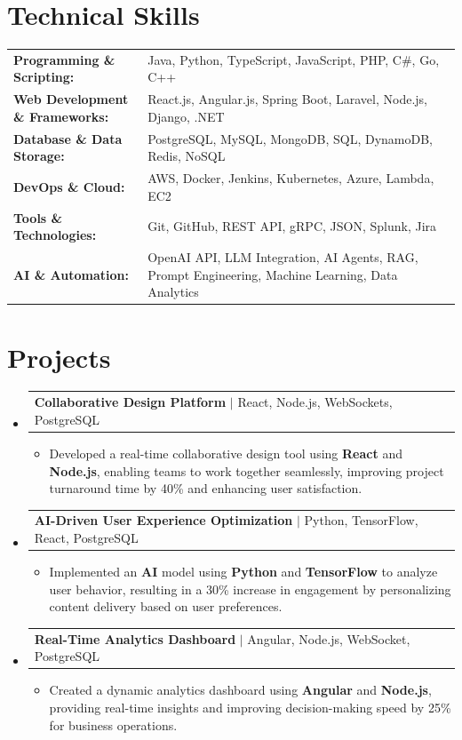 \documentclass[letterpaper,10pt]{article}
\makeatletter
\newcommand{\resumeItem}[1]{
  \item{\fontsize{8pt}{9pt}\selectfont
    #1 \vspace{-3pt}
  }
}
\newcommand{\resumeProjectHeading}[2]{
    \item
    \begin{tabular*}{1.001\textwidth}{l@{\extracolsep{\fill}}r}
      \fontsize{8.5pt}{10pt}#1 & \textbf{\fontsize{8.5pt}{10pt} #2}\\
    \end{tabular*}\vspace{-7pt}
}
\newcommand{\resumeSubHeadingListStart}{\begin{itemize}[leftmargin=0pt, label={}]}
\newcommand{\resumeSubHeadingListEnd}{\end{itemize}}
\newcommand{\resumeItemListStart}{\begin{itemize}[leftmargin=*]}
\newcommand{\resumeItemListEnd}{\end{itemize}\vspace{-5pt}}
\makeatother
\begin{document}
\section{Technical Skills}
        \vspace{-14pt}
        \begin{table}[h]
            \fontsize{8pt}{9pt}\selectfont
            \begin{tabular}{p{0.3\linewidth} p{0.7\linewidth}}
                \textbf{Programming \& Scripting:} & Java, Python, TypeScript, JavaScript, PHP, C\#, Go, C++ \\
                \textbf{Web Development \& Frameworks:} & React.js, Angular.js, Spring Boot, Laravel, Node.js, Django, .NET \\
                \textbf{Database \& Data Storage:} & PostgreSQL, MySQL, MongoDB, SQL, DynamoDB, Redis, NoSQL \\
                \textbf{DevOps \& Cloud:} & AWS, Docker, Jenkins, Kubernetes, Azure, Lambda, EC2 \\
                \textbf{Tools \& Technologies:} & Git, GitHub, REST API, gRPC, JSON, Splunk, Jira \\
                \textbf{AI \& Automation:} & OpenAI API, LLM Integration, AI Agents, RAG, Prompt Engineering, Machine Learning, Data Analytics \\
            \end{tabular}
        \end{table}
 \vspace{-18pt}

\section{Projects}
    \vspace{-5pt}
    \resumeSubHeadingListStart
          \resumeProjectHeading
            {\textbf{Collaborative Design Platform} $|$ React, Node.js, WebSockets, PostgreSQL}{}
            \resumeItemListStart
                \resumeItem{Developed a real-time collaborative design tool using \textbf{React} and \textbf{Node.js}, enabling teams to work together seamlessly, improving project turnaround time by 40\% and enhancing user satisfaction.}
            \resumeItemListEnd
        \vspace{-12pt}
    
        \resumeProjectHeading
            {\textbf{AI-Driven User Experience Optimization} $|$ Python, TensorFlow, React, PostgreSQL}{}
        \resumeItemListStart
                \resumeItem{Implemented an \textbf{AI} model using \textbf{Python} and \textbf{TensorFlow} to analyze user behavior, resulting in a 30\% increase in engagement by personalizing content delivery based on user preferences.}
        \resumeItemListEnd
      \vspace{-12pt}
      \resumeProjectHeading
        {\textbf{Real-Time Analytics Dashboard} $|$ Angular, Node.js, WebSocket, PostgreSQL}{}
    \resumeItemListStart
            \resumeItem{Created a dynamic analytics dashboard using \textbf{Angular} and \textbf{Node.js}, providing real-time insights and improving decision-making speed by 25\% for business operations.}
    \resumeItemListEnd
    \resumeSubHeadingListEnd
\end{document}

